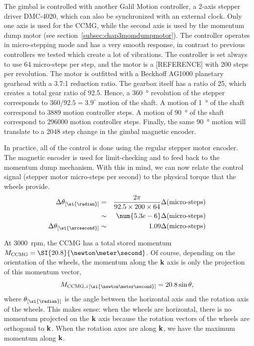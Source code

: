 The gimbal is controlled with another Galil Motion controller, a 2-axis stepper driver DMC-4020, which can also be synchronized with an external clock. Only one axis is used for the CCMG, while the second axis is used by the momentum dump motor (see section~\ref{subsec:chap3momdumpmotor}). The controller operates in micro-stepping mode and has a very smooth response, in contrast to previous controllers we tested which create a lot of vibrations. The controller is set always to use 64 micro-steps per step, and the motor is a [REFERENCE] with 200 steps per revolution. The motor is outfitted with a Beckhoff AG1000 planetary gearhead with a 3.7:1 reduction ratio. The gearbox itself has a ratio of 25, which creates a total gear ratio of 92.5. Hence, a \SI{360}{\degree} revolution of the stepper corresponds to $360/92.5=3.9^\circ$ motion of the shaft. A motion of \SI{1}{\degree} of the shaft correspond to \num{3889} motion controller steps. A motion of \SI{90}{\degree} of the shaft correspond to \num{296000} motion controller steps. Finally, the same \SI{90}{\degree} motion will translate to a \num{2048} step change in the gimbal magnetic encoder.

In practice, all of the control is done using the regular stepper motor encoder. The magnetic encoder is used for limit-checking and to feed back to the momentum dump mechanism. With this in mind, we can now relate the control signal (stepper motor micro-steps per second) to the physical torque that the wheels provide. 
\begin{eqnarray}
\Delta\theta\units{\si{\radian}} &= &\frac{2\pi}{92.5\times 200\times 64}\Delta(\textrm{micro-steps}) \\ 
& \sim & \num{5.3e-6} \Delta(\textrm{micro-steps})\\
\Delta\theta\units{\si{\arcsecond}} &\sim &  1.09 \Delta(\textrm{micro-steps})
\end{eqnarray}

At \num{3000}~rpm, the CCMG has a total stored momentum $\MCCMG= \SI{20.8}{\newton\meter\second}$. Of course, depending on the orientation of the wheels, the momentum along the $\textrm{\textbf{k}}$ axis is only the projection of this momentum vector,
\begin{equation}
\MCCMGz\units{\si{\newton\meter\second}} = 20.8\sin\theta,
\end{equation}
where $\theta\units{\si{\radian}}$ is the angle between the horizontal axis and the rotation axis of the wheels. This makes sense: when the wheels are horizontal, there is no momentum projected on the $\textrm{\textbf{k}}$ axis because the rotation vectors of the wheels are orthogonal to $\textrm{\textbf{k}}$. When the rotation axes are along $\textrm{\textbf{k}}$, we have the maximum momentum along $\textrm{\textbf{k}}$. 


